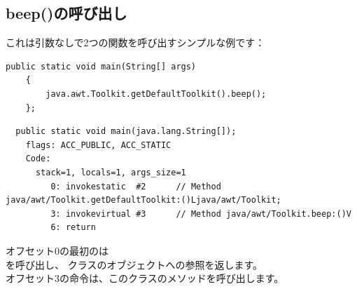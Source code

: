 \subsection{beep()の呼び出し}

これは引数なしで2つの関数を呼び出すシンプルな例です：

\begin{lstlisting}[style=customjava]
	public static void main(String[] args)
	{
		java.awt.Toolkit.getDefaultToolkit().beep();
	};
\end{lstlisting}

\begin{lstlisting}
  public static void main(java.lang.String[]);
    flags: ACC_PUBLIC, ACC_STATIC
    Code:
      stack=1, locals=1, args_size=1
         0: invokestatic  #2      // Method java/awt/Toolkit.getDefaultToolkit:()Ljava/awt/Toolkit;
         3: invokevirtual #3      // Method java/awt/Toolkit.beep:()V
         6: return        
\end{lstlisting}

オフセット0の最初のは\\
を呼び出し、
クラスのオブジェクトへの参照を返します。\\
オフセット3の命令は、このクラスのメソッドを呼び出します。